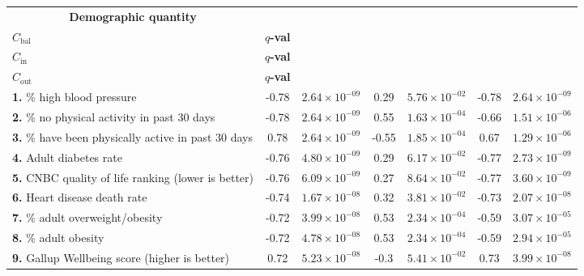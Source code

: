 \documentclass[10pt]{article}
\newcommand{\calin}{C_{\textrm{in}}}
\newcommand{\calout}{C_{\textrm{out}}}
\newcommand{\calbal}{C_{\textrm{bal}}}
\newcommand{\rhospearman}{\hat{\rho}_{\textrm{s}}}
\begin{document}
\begin{table*}
\footnotesize
\begin{longtable}{|l|c|c|c|c|c|c|}
\hline \multicolumn{1}{|c|}{\textbf{Demographic quantity}}
& \begin{tabular}{@{}c@{}} $\rhospearman$ for \\ $\calbal$ 
\end{tabular} 
& \textbf{$q$-val}
& \begin{tabular}{@{}c@{}}$\rhospearman$ for \\ $\calin$ 
\end{tabular} & \textbf{$q$-val} & 
\begin{tabular}{@{}c@{}}$\rhospearman$ for \\ 
$\calout$ \end{tabular} & 
\textbf{$q$-val} \\\hline
 \textbf{1.} \% high blood pressure \cite{america} & -0.78 & $2.64\times 10^{-09}$ & 0.29 & $5.76\times 10^{-02}$ & -0.78 & $2.64\times 10^{-09}$ \\\hline
 \textbf{2.} \% no physical activity in past 30 days \cite{america} & -0.78 & $2.64\times 10^{-09}$ & 0.55 & $1.63\times 10^{-04}$ & -0.66 & $1.51\times 10^{-06}$ \\\hline
 \textbf{3.} \% have been physically active in past 30 days \cite{america} & 0.78 & $2.64\times 10^{-09}$ & -0.55 & $1.85\times 10^{-04}$ & 0.67 & $1.29\times 10^{-06}$ \\\hline
 \textbf{4.} Adult diabetes rate \cite{cdc} & -0.76 & $4.80\times 10^{-09}$ & 0.29 & $6.17\times 10^{-02}$ & -0.77 & $2.73\times 10^{-09}$ \\\hline
 \textbf{5.} CNBC quality of life ranking \cite{cnbc} (lower is better) & -0.76 & $6.09\times 10^{-09}$ & 0.27 & $8.64\times 10^{-02}$ & -0.77 & $3.60\times 10^{-09}$ \\\hline
 \textbf{6.} Heart disease death rate \cite{kff} & -0.74 & $1.67\times 10^{-08}$ & 0.32 & $3.81\times 10^{-02}$ & -0.73 & $2.07\times 10^{-08}$ \\\hline
 \textbf{7.} \% adult overweight/obesity \cite{kff} & -0.72 & $3.99\times 10^{-08}$ & 0.53 & $2.34\times 10^{-04}$ & -0.59 & $3.07\times 10^{-05}$ \\\hline
 \textbf{8.} \% adult obesity \cite{cdc} & -0.72 & $4.78\times 10^{-08}$ & 0.53 & $2.34\times 10^{-04}$ & -0.59 & $2.94\times 10^{-05}$ \\\hline
 \textbf{9.} Gallup Wellbeing score \cite{gallup} (higher is better) & 0.72 & $5.23\times 10^{-08}$ & -0.3 & $5.41\times 10^{-02}$ & 0.73 & $3.99\times 10^{-08}$ \\\hline

\end{longtable}
\end{table*}
\end{document}
